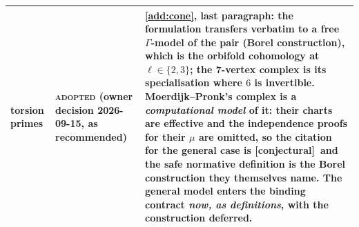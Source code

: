 \documentclass[11pt]{article}
\theoremstyle{remark}
\newcommand{\Ga}{\Gamma}
\newcommand{\CONJ}{\textsf{[conjectural]}}
\begin{document}
\begin{center}
\begin{longtable}{@{}>{\raggedright\arraybackslash}p{2.4cm}>{\raggedright\arraybackslash}p{2.3cm}>{\raggedright\arraybackslash}p{10.8cm}@{}}
torsion primes & \textsc{adopted} (owner decision 2026-09-15, as recommended) & \ref{add:cone}, last paragraph: the formulation transfers verbatim to a free $\Ga$-model of the pair (Borel construction), which is the orbifold cohomology at $\ell\in\{2,3\}$; the 7-vertex complex is its specialisation where $6$ is invertible. Moerdijk--Pronk's complex is a \emph{computational model} of it: their charts are effective and the independence proofs for their $\mu$ are omitted, so the citation for the general case is \CONJ\ and the safe normative definition is the Borel construction they themselves name. The general model enters the binding contract \emph{now, as definitions}, with the construction deferred. \\
\bottomrule
\end{longtable}
\end{center}
\end{document}
